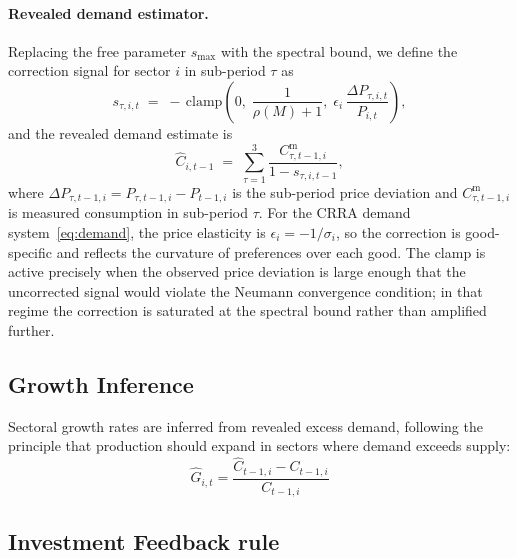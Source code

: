 \paragraph{Revealed demand estimator.}
Replacing the free parameter $s_{\max}$ with the spectral bound, we
define the correction signal for sector $i$ in sub-period $\tau$ as
%
\begin{equation}\label{eq:correction_signal}
    s_{\tau,i,t}
    \;=\;
    -\,\mathrm{clamp}\!\left(
        0,\;
        \frac{1}{\rho(M)+1},\;
        \epsilon_i\,\frac{\Delta P_{\tau,i,t}}{P_{i,t}}
    \right),
\end{equation}
%
and the revealed demand estimate is
%
\begin{equation}\label{eq:revealed_demand}
    \hat{C}_{i,t-1}
    \;=\;
    \sum_{\tau=1}^{3}
    \frac{C^{\mathrm{m}}_{\tau,t-1,i}}{1 - s_{\tau,i,t-1}},
\end{equation}
%
where $\Delta P_{\tau,t-1,i} = P_{\tau,t-1,i} - P_{t-1,i}$ is the
sub-period price deviation and $C^{\mathrm{m}}_{\tau,t-1,i}$ is
measured consumption in sub-period $\tau$.
For the CRRA demand system~\eqref{eq:demand}, the price elasticity is
$\epsilon_i = -1/\sigma_i$, so the correction is good-specific and
reflects the curvature of preferences over each good.
The clamp is active precisely when the observed price deviation is
large enough that the uncorrected signal would violate the Neumann
convergence condition; in that regime the correction is saturated at
the spectral bound rather than amplified further.

\subsection{Growth Inference}

Sectoral growth rates are inferred from revealed excess demand,
following the principle that production should expand in sectors where
demand exceeds supply:
\begin{equation}\label{eq:growth_inference}
    \hat{G}_{i, t} =  \frac{\hat{C}_{t-1, i} - C_{t-1, i}}{C_{t-1, i}}
\end{equation}

\subsection{Investment Feedback rule}

